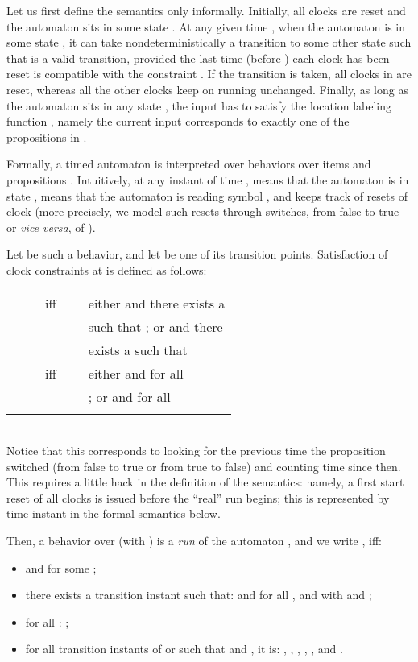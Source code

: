 \documentclass[a4paper]{article}
\theoremstyle{plain}
\theoremstyle{definition}
\begin{document}
Let us first define the semantics only informally.
Initially, all clocks are reset and the automaton sits in some state .
At any given time , when the automaton is in some state , it can take nondeterministically a transition to some other state  such that  is a valid transition, provided the last time (before ) each clock has been reset is compatible with the constraint .
If the transition is taken, all clocks in  are reset, whereas all the other clocks keep on running unchanged.
Finally, as long as the automaton sits in any state , the input has to satisfy the location labeling function , namely the current input corresponds to exactly one of the propositions in .

Formally, a timed automaton  is interpreted over behaviors over items  and propositions .
Intuitively, at any instant of time ,  means that the automaton is in state ,  means that the automaton is reading symbol , and  keeps track of resets of clock  (more precisely, we model such resets through switches, from false to true or \emph{vice versa}, of ).

Let  be such a behavior, and let  be one of its transition points.
Satisfaction of clock constraints at  is defined as follows: \\
\begin{tabular}{l c l}
    & \ \ \ iff\ \ \ &  either  and there exists a  \\
                                       && such that ; or  and there \\ 
                                       && exists a  such that  \\
    & \ \ \ iff\ \ \ &  either  and for all  \\
                                       && ; or  and for all \\
                                       && 
\end{tabular} \\
Notice that this corresponds to looking for the previous time the proposition  switched (from false to true or from true to false) and counting time since then.
This requires a little hack in the definition of the semantics: namely, a first start reset of all clocks is issued before the ``real'' run begins; this is represented by time instant  in the formal semantics below.

Then, a behavior  over  (with ) is a \emph{run} of the automaton , and we write , iff:
\begin{itemize}
\item  and  for some ;
\item there exists a transition instant  such that:  and  for all ,  and  with  and ;
\item for all : ;
\item for all transition instants  of  or  such that  and , it is: , , , , , and .
\end{itemize}
\end{document}
